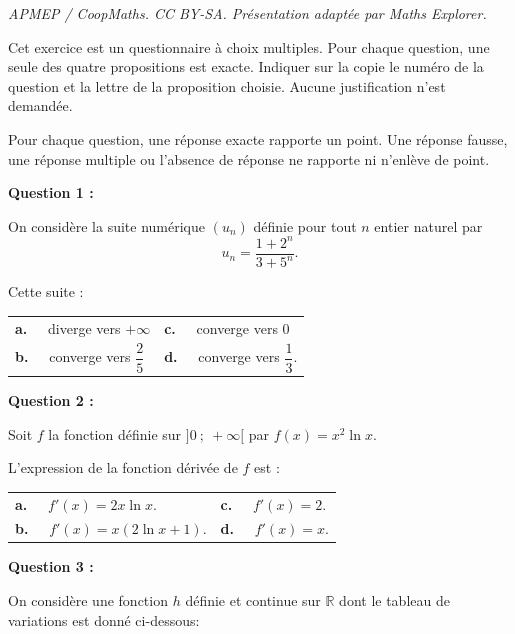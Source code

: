 \documentclass[10pt]{article}
\providecommand{\R}{\mathbb{R}}
\begin{document}
\noindent\textit{APMEP / CoopMaths. CC BY-SA. Présentation adaptée par Maths Explorer.}\par\medskip
\medskip

Cet exercice est un questionnaire à choix multiples.
Pour chaque question, une seule des quatre propositions est exacte.
Indiquer sur la copie le numéro de la question et la lettre de la proposition choisie.
Aucune justification n'est demandée.

\smallskip

Pour chaque question, une réponse exacte rapporte un point. Une réponse fausse, une réponse multiple ou l'absence de réponse ne rapporte ni n'enlève de point.

\bigskip

\textbf{Question 1 :}

\medskip

On considère la suite numérique $\left(u_n\right)$ définie pour tout $n$ entier naturel par 
\[u_n = \dfrac{1 + 2^n}{3 + 5^n}.\]

Cette suite :

\smallskip

\begin{tabularx}{\linewidth}{X X}
\textbf{a.~~} diverge vers $+\infty$ &\textbf{c.~~} converge vers 0\\
\textbf{b.~~} converge vers $\dfrac25$ &\textbf{d.~~} converge vers $\dfrac13$.
\end{tabularx}

\medskip

\textbf{Question 2 :}

\medskip

Soit $f$ la fonction définie sur $]0~;~ +\infty[$ par $f(x) = x^2\ln x$.

L'expression de la fonction dérivée de $f$ est :

\smallskip

\begin{tabularx}{\linewidth}{X X}
\textbf{a.~~} $f'(x) = 2x\ln x$.&\textbf{c.~~} $f'(x) = 2$.\\
\textbf{b.~~} $f'(x) = x(2\ln x + 1)$.&\textbf{d.~~} $f'(x) = x$.
\end{tabularx}

\medskip

\textbf{Question 3 :}

\medskip

On considère une fonction $h$ définie et continue sur $\R$ dont le tableau de variations est donné ci-dessous:
\end{document}
